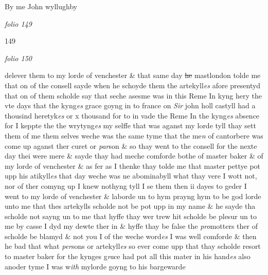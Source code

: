 \documentclass[12pt, a4paper]{book}
\begin{document}
		\ifthenelse{\isodd{\thepage}}
		{\reversemarginpar}
		{\normalmarginpar}
		By me John wyllughby

\dotfill
					

\textit{folio 149}


\begin{flushright}{\color{Mahogany}149}\end{flushright}

\dotfill
					

\textit{folio 150}


 	
		\ifthenelse{\isodd{\thepage}}
		{\reversemarginpar}
		{\normalmarginpar}
		delever them to my lorde of venchester \& that same day \sout{he} mastlondon
			 tolde me
 that on of the consell sayde when he schoyde them the artekyll\textit{es} afore
 presentyd that on of them scholde say that seche asesme was in this
 Reme In kyng hery the vte days that the kyng\textit{es} grace goyng in
 to france on \textit{Sir} john holl castyll had a thousind heretyk\textit{es} or x thousand
 for to in vade the Reme In the kyng\textit{es} absence for I keppte the
 the wrytyng\textit{es} my selffe that was aganst my lorde tyll thay sett
 them of me them selves weche was the same tyme that the me\textit{n} of
 		cantorbere was come up aganst ther curet or \textit{par}son \& so thay went to
 the consell for the nexte day thei were mere \& sayde thay had
 meche comforde bothe of master baker \& of my lorde of venchester
 \& as fer as I thenke thay tolde me that master pettye pot upp his
 atikyll\textit{es} that day weche was ne abominabyll what thay vere I
 wott not, nor of ther comyng up I knew nothyng tyll I se them
 then ii dayes to geder I went to my lorde of venchester \& laborde
 un to hym prayng hym to be god lorde unto me that thes artekylls
 scholde not be pot upp in my name \& he sayde tha scholde not
 sayng un to me that hyffe thay wer trew hit scholde be plesur
 un to me by casse I dyd my dewte ther in \& hyffe thay be false
 the \textit{pro}motters ther of scholde be blamyd \& not you I of the weche
 word\textit{es} I was well comforde \& then he bad that what \textit{per}sons or
 artekyll\textit{es} so ever come upp that thay scholde resort to master
 baker for the kynges g\textit{ra}ce had pot all this mater in his hand\textit{es}
 also anoder tyme I was w\textit{ith} mylorde goyng to his bargewarde
\end{document}
